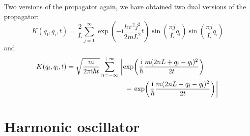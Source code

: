 \documentclass[t,dvipsnames]{beamer}
\begin{document}
\begin{frame}[t]{Two versions of the propagator}
 again, we have obtained two dual versions of the propagator:
 \begin{displaymath}
  K(q_\text{f}, q_\text{i}, t) = \frac{2}{L}\sum_{j=1}^{\infty}
    \exp\left(-\text{i}\frac{\hbar\pi^2j^2}{2mL^2}t\right)
	 \sin\!\left(\frac{\pi j}{L}q_\text{f}\right)
	 \sin\!\left(\frac{\pi j}{L}q_\text{i}\right)
 \end{displaymath}
 and
 \begin{displaymath}
  \begin{aligned}
   K(q_\text{f}, q_\text{i}, t) &= \sqrt{\frac{m}{2\pi\text{i}\hbar t}}\sum_{n=-\infty}^{+\infty}
    \left[\exp\!\left(\frac{\text{i}}{\hbar}
	  \frac{m(2nL+q_\text{f}-q_\text{i})^2}{2t}\right)\right.\\
    &\hspace{3truecm}-\left.\exp\!\left(\frac{\text{i}}{\hbar}
	  \frac{m(2nL-q_\text{f}-q_\text{i})^2}{2t}\right)\right]
  \end{aligned}
 \end{displaymath}

 \vspace{0.2truecm}
 \begin{center}
 \end{center}
\end{frame}

\section{Harmonic oscillator}

\begin{frame}[c]{}
 \begin{center}
  \begin{minipage}{0.8\textwidth}
   \tableofcontents[currentsection]
  \end{minipage}
 \end{center}
\end{frame}

\begin{frame}[t]{}
\end{frame}
\end{document}
